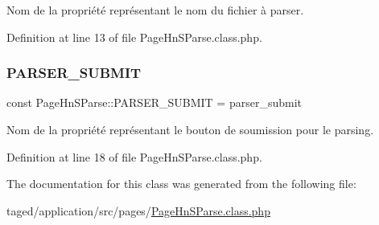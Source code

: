 Nom de la propriété représentant le nom du fichier à parser. 

Definition at line 13 of file Page\+Hn\+S\+Parse.\+class.\+php.

\mbox{\label{class_page_hn_s_parse_a6e3ba750afd46ce3745277a9b4617cb3}} 
\subsubsection{\texorpdfstring{P\+A\+R\+S\+E\+R\+\_\+\+S\+U\+B\+M\+IT}{PARSER\_SUBMIT}}
{\footnotesize\ttfamily const Page\+Hn\+S\+Parse\+::\+P\+A\+R\+S\+E\+R\+\_\+\+S\+U\+B\+M\+IT = \textquotesingle{}parser\+\_\+submit\textquotesingle{}}

Nom de la propriété représentant le bouton de soumission pour le parsing. 

Definition at line 18 of file Page\+Hn\+S\+Parse.\+class.\+php.



The documentation for this class was generated from the following file\+:\begin{DoxyCompactItemize}
\item 
taged/application/src/pages/\hyperlink{_page_hn_s_parse_8class_8php}{Page\+Hn\+S\+Parse.\+class.\+php}\end{DoxyCompactItemize}
